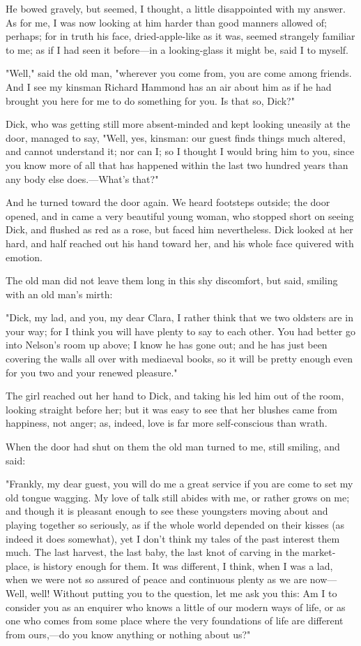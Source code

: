 He bowed gravely, but seemed, I thought, a little disappointed with my
answer. As for me, I was now looking at him harder than good manners
allowed of; perhaps; for in truth his face, dried-apple-like as it was,
seemed strangely familiar to me; as if I had seen it before---in a
looking-glass it might be, said I to myself.

"Well," said the old man, "wherever you come from, you are come among
friends. And I see my kinsman Richard Hammond has an air about him as if
he had brought you here for me to do something for you. Is that so,
Dick?"

Dick, who was getting still more absent-minded and kept looking uneasily
at the door, managed to say, "Well, yes, kinsman: our guest finds things
much altered, and cannot understand it; nor can I; so I thought I would
bring him to you, since you know more of all that has happened within
the last two hundred years than any body else does.---What's that?"

And he turned toward the door again. We heard footsteps outside; the
door opened, and in came a very beautiful young woman, who stopped short
on seeing Dick, and flushed as red as a rose, but faced him
nevertheless. Dick looked at her hard, and half reached out his hand
toward her, and his whole face quivered with emotion.

The old man did not leave them long in this shy discomfort, but said,
smiling with an old man's mirth:

"Dick, my lad, and you, my dear Clara, I rather think that we two
oldsters are in your way; for I think you will have plenty to say to
each other. You had better go into Nelson's room up above; I know he has
gone out; and he has just been covering the walls all over with
mediaeval books, so it will be pretty enough even for you two and your
renewed pleasure."

The girl reached out her hand to Dick, and taking his led him out of the
room, looking straight before her; but it was easy to see that her
blushes came from happiness, not anger; as, indeed, love is far more
self-conscious than wrath.

When the door had shut on them the old man turned to me, still smiling,
and said:

"Frankly, my dear guest, you will do me a great service if you are come
to set my old tongue wagging. My love of talk still abides with me, or
rather grows on me; and though it is pleasant enough to see these
youngsters moving about and playing together so seriously, as if the
whole world depended on their kisses (as indeed it does somewhat), yet I
don't think my tales of the past interest them much. The last harvest,
the last baby, the last knot of carving in the market-place, is history
enough for them. It was different, I think, when I was a lad, when we
were not so assured of peace and continuous plenty as we are now---Well,
well! Without putting you to the question, let me ask you this: Am I to
consider you as an enquirer who knows a little of our modern ways of
life, or as one who comes from some place where the very foundations of
life are different from ours,---do you know anything or nothing about
us?"

